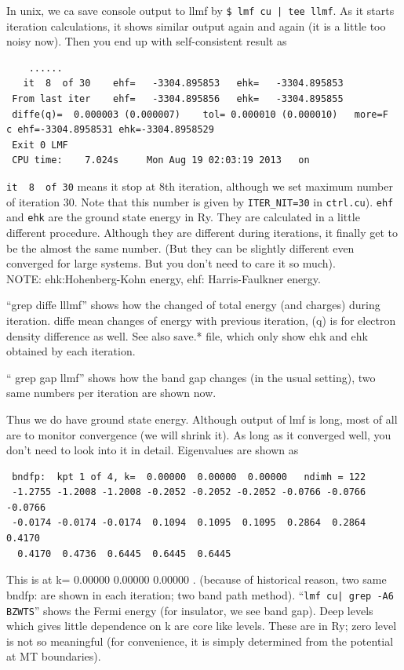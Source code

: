 In unix, we ca save console output to llmf by
\verb+$ lmf cu | tee llmf+.
As it starts iteration calculations, 
it shows similar output again and again (it is a little too noisy now).
Then you end up with self-consistent result as
\begin{verbatim}
    ......
   it  8  of 30    ehf=   -3304.895853   ehk=   -3304.895853
 From last iter    ehf=   -3304.895856   ehk=   -3304.895855
 diffe(q)=  0.000003 (0.000007)    tol= 0.000010 (0.000010)   more=F
c ehf=-3304.8958531 ehk=-3304.8958529
 Exit 0 LMF 
 CPU time:    7.024s     Mon Aug 19 02:03:19 2013   on  
\end{verbatim}
\verb+it  8  of 30+ means it stop at 8th iteration, although we set
maximum number of iteration 30. Note that this number is 
given by \verb+ITER_NIT=30+ in \verb+ctrl.cu+).
\verb+ehf+ and \verb+ehk+ are the ground state energy in Ry.
They are calculated in a little different procedure. Although
they are different during iterations, it finally get to be the
almost the same number. (But they can be slightly different 
even converged for large systems. But you don't need to care it so much).\\
NOTE: ehk:Hohenberg-Kohn energy, ehf: Harris-Faulkner energy.

``grep diffe lllmf'' shows how the changed of total energy (and charges)
during iteration. diffe mean  changes of energy with previous
iteration, (q) is for electron density difference as well.
See also save.* file, which only show ehk and ehk obtained by each
iteration.

`` grep gap llmf'' shows how the band gap changes
(in the usual setting), two same numbers per iteration are shown now.

Thus we do have ground state energy.
Although output of lmf is long, most of all are to monitor
convergence (we will shrink it).
As long as it converged well, you don't need to look into it in detail.
Eigenvalues are shown as
\begin{verbatim}
 bndfp:  kpt 1 of 4, k=  0.00000  0.00000  0.00000   ndimh = 122
 -1.2755 -1.2008 -1.2008 -0.2052 -0.2052 -0.2052 -0.0766 -0.0766 -0.0766
 -0.0174 -0.0174 -0.0174  0.1094  0.1095  0.1095  0.2864  0.2864  0.4170
  0.4170  0.4736  0.6445  0.6445  0.6445
\end{verbatim}
This is at k=  0.00000  0.00000  0.00000 .
(because of historical reason, two same bndfp: are shown in each
iteration; two band path method).  ``\verb+lmf cu| grep -A6 BZWTS+'' shows the Fermi energy
(for insulator, we see band gap). 
Deep levels which gives little dependence on k are core like levels.
These are in Ry; zero level is not so meaningful (for convenience, it is
simply determined from the potential at MT boundaries).

